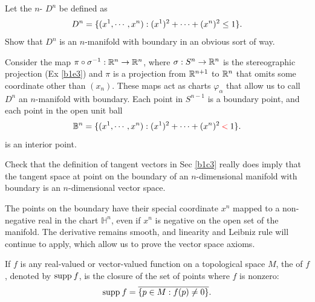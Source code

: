 \documentclass[10pt]{article}
\begin{document}
\begin{example}\label{b1e84}
	Let the $n$- $D^n$ be defined as
	$$
	D^n = \lbrace(x^1, \cdots, x^n): (x^1)^2 + \cdots + (x^n)^2 \le 1\rbrace.
	$$
	Show that $D^n$ is an $n$-manifold with boundary in an obvious sort of way.
\end{example}
\sol Consider the map $\pi \circ \sigma^{-1}: \mathbb{R}^n \to \mathbb{R}^n$, where $\sigma:S^n \to \mathbb{R}^n$ is the stereographic projection (Ex \ref{b1e3}) and $\pi$ is a projection from $\mathbb{R}^{n+1}$ to $\mathbb{R}^n$ that omits some coordinate other than $(x_n)$. These maps act as charts $\varphi_\alpha$ that allow us to call $D^n$ an $n$-manifold with boundary. Each point in $S^{n-1}$ is a boundary point, and each point in the open unit ball
$$
\mathbb{B}^n = \lbrace(x^1, \cdots, x^n): (x^1)^2 + \cdots + (x^n)^2 {\:\color{red}<\:} 1\rbrace.
$$
is an interior point.


\begin{example}
	Check that the definition of tangent vectors in Sec \ref{b1c3} really does imply that the tangent space at point on the boundary of an $n$-dimensional manifold with boundary is an $n$-dimensional vector space.
\end{example}
\sol The points on the boundary have their special coordinate $x^n$ mapped to a non-negative real in the chart $\mathbb{H}^n$, even if $x^n$ is negative on the open set of the manifold. The derivative remains smooth, and linearity and Leibniz rule will continue to apply, which allow us to prove the vector space axioms.


\begin{definition}
	If $f$ is any real-valued or vector-valued function on a topological space $M$, the  of $f$, denoted by $\text{supp\:} f$, is the closure of the set of points where $f$ is nonzero:
	$$
		\text{supp\:} f = \overline{\{p \in M:f(p)\ne 0\}}.
	$$
\end{definition}
\end{document}
